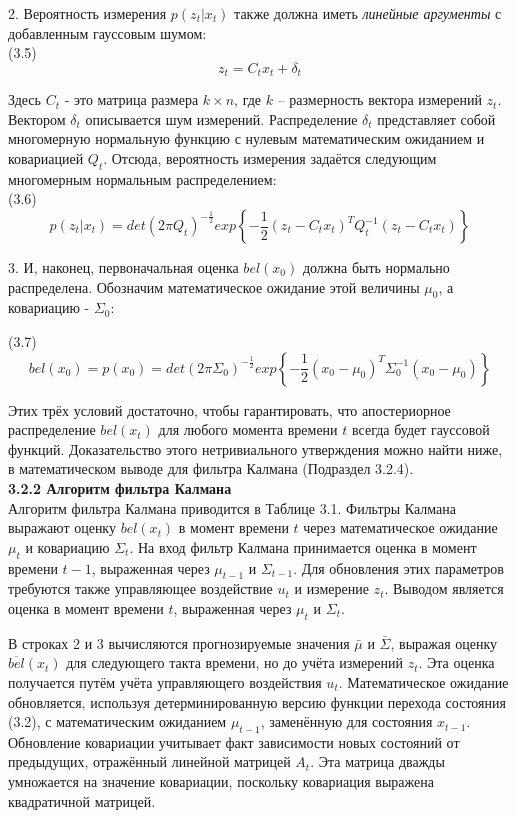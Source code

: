 \documentclass[10pt,a4paper]{article}
\begin{document}
2. Вероятность измерения $p(z_t | x_t)$ также должна иметь \textit{линейные аргументы} с добавленным гауссовым шумом:\\

(3.5) $$z_t=C_t x_t+\delta_t$$

Здесь $C_t$ - это матрица размера $k\times n$, где $k$ – размерность вектора измерений $z_t$. Вектором $\delta_t$ описывается шум измерений. Распределение $\delta_t$ представляет собой многомерную нормальную функцию с нулевым математическим ожиданием и ковариацией $Q_t$. Отсюда, вероятность измерения задаётся следующим многомерным нормальным распределением:\\

(3.6)$$p(z_t|x_t)=det(2\pi Q_t)^{-\frac{1}{2}}exp\left\lbrace -\frac{1}{2}(z_t-C_t x_t)^T Q_t^{-1}(z_t-C_t x_t)\right\rbrace$$

3. И, наконец, первоначальная оценка $bel(x_0)$ должна быть нормально распределена. Обозначим математическое ожидание этой величины $\mu_0$, а ковариацию - $\varSigma_0$:

(3.7)$$bel(x_0)=p(x_0)=det(2\pi \varSigma_0)^{-\frac{1}{2}}exp\left\lbrace-{\frac{1}{2}}(x_0-\mu_0)^T\varSigma_0^{-1}(x_0-\mu_0)\right\rbrace$$

Этих трёх условий достаточно, чтобы гарантировать, что апостериорное распределение $bel(x_t)$ для любого момента времени $t$ всегда будет гауссовой функций. Доказательство этого нетривиального утверждения можно найти ниже, в математическом выводе для фильтра Калмана (Подраздел 3.2.4).\\

\textbf{3.2.2 Алгоритм фильтра Калмана}\\

Алгоритм фильтра Калмана приводится в Таблице 3.1. Фильтры Калмана выражают оценку $bel(x_t)$ в момент времени $t$ через математическое ожидание $\mu_t$ и ковариацию $\varSigma_t$. На вход фильтр Калмана принимается оценка в момент времени $t-1$, выраженная через $\mu_{t-1}$ и $\varSigma_{t-1}$. Для обновления этих параметров требуются также управляющее воздействие $u_t$ и измерение $z_t$. Выводом является оценка в момент времени $t$, выраженная через $\mu_t$ и $\varSigma_t$.

В строках 2 и 3 вычисляются прогнозируемые значения $\bar{\mu}$ и $\bar{\varSigma}$, выражая оценку $\overline{bel}(x_t)$ для следующего такта времени, но до учёта измерений $z_t$. Эта оценка получается путём учёта управляющего воздействия $u_t$. Математическое ожидание обновляется, используя детерминированную версию функции перехода состояния (3.2), с математическим ожиданием $\mu_{t-1}$, заменённую для состояния $x_{t-1}$. Обновление ковариации учитывает факт зависимости новых состояний от предыдущих, отражённый
линейной матрицей $A_t$. Эта матрица дважды умножается на значение ковариации, поскольку ковариация выражена квадратичной матрицей.
\end{document}
